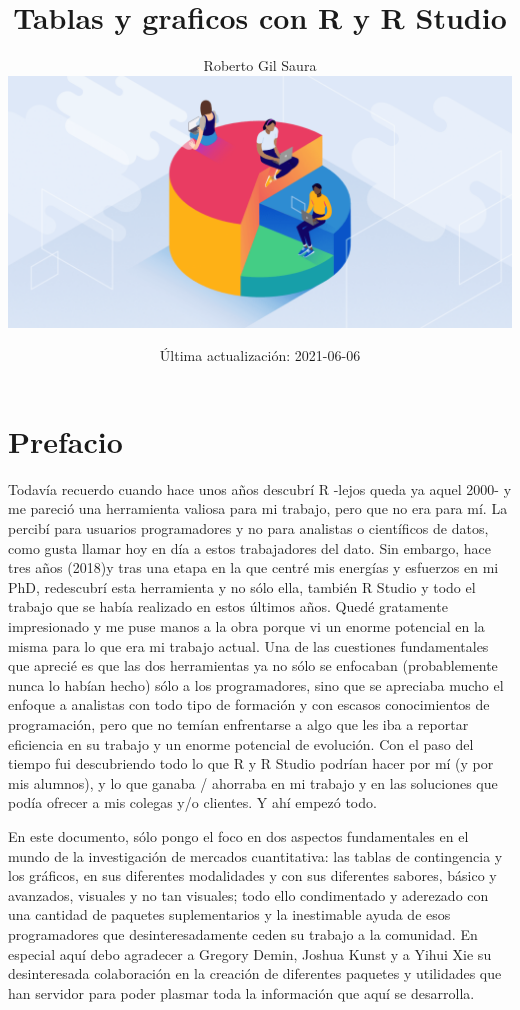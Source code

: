 \documentclass[
]{book}
\title{Tablas y graficos con R y R Studio}
\author{Roberto Gil Saura\includegraphics{data/portada.png}}
\date{Última actualización: 2021-06-06}
\begin{document}
\maketitle

{
\setcounter{tocdepth}{1}
\tableofcontents
}
\hypertarget{prefacio}{%
\chapter*{Prefacio}\label{prefacio}}

Todavía recuerdo cuando hace unos años descubrí R \citep{R-base} -lejos queda ya aquel 2000- y me pareció una herramienta valiosa para mi trabajo, pero que no era para mí. La percibí para usuarios programadores y no para analistas o científicos de datos, como gusta llamar hoy en día a estos trabajadores del dato. Sin embargo, hace tres años (2018)y tras una etapa en la que centré mis energías y esfuerzos en mi PhD, redescubrí esta herramienta y no sólo ella, también R Studio y todo el trabajo que se había realizado en estos últimos años. Quedé gratamente impresionado y me puse manos a la obra porque vi un enorme potencial en la misma para lo que era mi trabajo actual. Una de las cuestiones fundamentales que aprecié es que las dos herramientas ya no sólo se enfocaban (probablemente nunca lo habían hecho) sólo a los programadores, sino que se apreciaba mucho el enfoque a analistas con todo tipo de formación y con escasos conocimientos de programación, pero que no temían enfrentarse a algo que les iba a reportar eficiencia en su trabajo y un enorme potencial de evolución. Con el paso del tiempo fui descubriendo todo lo que R y R Studio podrían hacer por mí (y por mis alumnos), y lo que ganaba / ahorraba en mi trabajo y en las soluciones que podía ofrecer a mis colegas y/o clientes. Y ahí empezó todo.

En este documento, sólo pongo el foco en dos aspectos fundamentales en el mundo de la investigación de mercados cuantitativa: las tablas de contingencia y los gráficos, en sus diferentes modalidades y con sus diferentes sabores, básico y avanzados, visuales y no tan visuales; todo ello condimentado y aderezado con una cantidad de paquetes suplementarios y la inestimable ayuda de esos programadores que desinteresadamente ceden su trabajo a la comunidad. En especial aquí debo agradecer a Gregory Demin, Joshua Kunst y a Yihui Xie su desinteresada colaboración en la creación de diferentes paquetes y utilidades que han servidor para poder plasmar toda la información que aquí se desarrolla.
\end{document}
